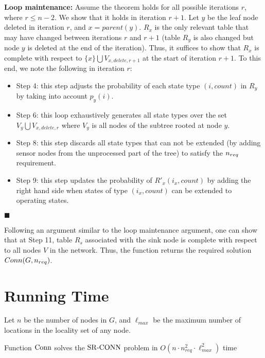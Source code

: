 \nwline
{\bf Loop maintenance:}
Assume the theorem holds for all possible iterations $r$, where $r \leq n-2$.
We show that it holds in iteration $r+1$.
%
Let $y$ be the leaf node deleted in iteration $r$, and $x= parent(y)$.
$R_x$ is the only relevant table that may have changed between iterations
$r$ and $r+1$ (table $R_y$ is also changed but node $y$ is deleted at the end of the iteration).
%
Thus, it suffices to show that $R_x$ is complete with respect to
$\{ x \} \bigcup V_{x,delete,r+1}$ at the start of iteration $r+1$.
%
To this end, we note the following in iteration $r$:
%
\begin{itemize}[noitemsep]
\item  Step 4: this step adjusts the probability of each state type
       $(i,count)$ in $R_y$ by taking into account $p_y(i)$.
\item  Step 6: this loop exhaustively generates all state types over the
       set $V_y \bigcup V_{x,delete,r}$ where $V_y$ is all nodes of
       the subtree rooted at node $y$.
\item  Step 8: this step discards all state types that can not be extended
       (by adding sensor nodes from the unprocessed part of the tree)
       to satisfy the ${n_{req}}$ requirement.
\item  Step 9: this step updates the probability of $R'_x(i_x,count)$ by
       adding the right hand side when states of type $(i_x, count)$
       can be extended to operating states.
\end{itemize}
$\blacksquare$

Following an argument similar to the loop maintenance argument, one can
show that at Step 11, table $R_s$ associated with the sink node is
complete with respect to all nodes $V$ in the network.
%
Thus, the function returns the required solution $Conn(G, {n_{req}})$.


\section{Running Time}

Let $n$ be the number of nodes in $G$, and $\ell_{max}$ be the maximum
number of locations in the locality set of any node.

\begin{theorem}
\normalfont
    Function ${\mathrm {Conn}}$ solves the ${\mathrm {SR\mbox{-}CONN}}$ problem in
    $O(n \cdot n_{req}^2  \cdot \ell_{max}^2)$ time
\end{theorem}

